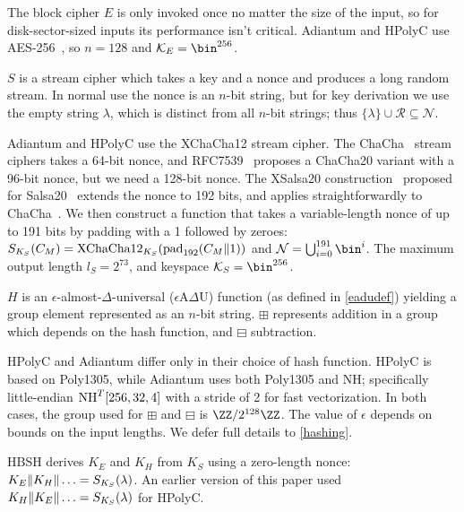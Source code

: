 \documentclass[eprint.tex]{subfiles}
\begin{document}
The block cipher $E$
is only invoked once no matter the size of the input, so for disk-sector-sized inputs
its performance isn't critical. Adiantum and HPolyC use AES-256~\cite{AES}, so $n = 128$ and $\mathcal{K}_E = \bin^{256}$.

$S$
is a stream cipher which takes a key and a nonce and produces a long random stream. In normal use
the nonce is an $n$-bit string, but for key derivation we use the empty string $\lambda$, which
is distinct from all $n$-bit strings; thus $\{\lambda \} \cup \mathcal{R} \subseteq \mathcal{N}$.

Adiantum and HPolyC use the XChaCha12 stream cipher.
The ChaCha~\cite{chacha}
stream ciphers takes a 64-bit nonce, and RFC7539~\cite{RFC7539} proposes
a ChaCha20 variant with a 96-bit nonce, but we need a 128-bit nonce.
The XSalsa20 construction~\cite{xsalsa}
proposed for Salsa20~\cite{salsa20,salsa812} extends the nonce to 192 bits, and
applies straightforwardly to ChaCha~\cite{xchacha,monocypher,libsodiumxchacha}.
We then construct a function that takes a variable-length nonce of up to
191 bits by padding with a 1 followed by zeroes:
$S_{K_S}(C_M) = \XChaCha12_{K_S}(\pad_{192}(C_M \Concat 1))$ and
$\mathcal{N} = \bigcup_{i=0}^{191}\bin^i$.
The maximum output length $l_S = 2^{73}$,
and keyspace $\mathcal{K}_S = \bin^{256}$.

$H$
is an $\epsilon$-almost-$\Delta$-universal ($\epsilon$A$\Delta$U) function
(as defined in \autoref{eadudef})
yielding a group element represented as an $n$-bit string.
$\boxplus$ represents addition in a group which depends
on the hash function, and $\boxminus$ subtraction.

\begin{sloppypar}
    HPolyC and Adiantum differ only in their choice of hash function. HPolyC is
    based on Poly1305, while Adiantum uses both Poly1305 and NH;
    specifically little-endian $\operatorname{NH}^T[256, 32, 4]$ with a stride of 2 for fast
    vectorization. In both cases, the group used for $\boxplus$ and $\boxminus$ is
    $\ZZ/2^{128}\ZZ$. The value of $\epsilon$ depends on bounds on the input
    lengths.
    We defer full details to \autoref{hashing}.
\end{sloppypar}

HBSH derives $K_E$ and $K_H$ from $K_S$ using a zero-length nonce:
$K_E \Vert K_H \Vert \ldots = S_{K_S}(\lambda)$. An earlier version of this paper
used $K_H \Vert K_E \Vert \ldots = S_{K_S}(\lambda)$ for HPolyC.

\subbib
\end{document}
